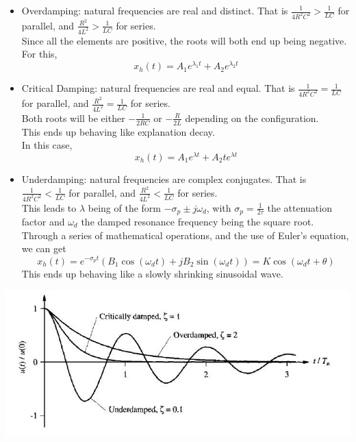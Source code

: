 \documentclass[nobib]{tufte-handout}
\begin{document}
\begin{itemize}
    \item Overdamping: natural frequencies are real and distinct. That is
          $\frac{1}{4R^2C^2} > \frac{1}{LC}$ for parallel, and $\frac{R^2}{4L^2} >
              \frac{1}{LC}$ for series.\\Since all the elements are positive, the roots will
          both end up being negative. \\ For this,
          \begin{equation*}
              x_h(t)=A_1e^{\lambda_1t}+A_2e^{\lambda_2t}
          \end{equation*}
    \item Critical Damping: natural frequencies are real and equal. That is
          $\frac{1}{4R^2C^2} = \frac{1}{LC}$ for parallel, and $\frac{R^2}{4L^2} =
              \frac{1}{LC}$ for series.\\ Both roots will be either $-\frac{1}{2RC}$ or
          $-\frac{R}{2L}$ depending on the configuration.\\This ends up behaving like
          explanation decay.\\ In this case,
          \begin{equation*}
              x_h(t) = A_1e^{\lambda t}+A_2te^{\lambda t}
          \end{equation*}
    \item Underdamping: natural frequencies are complex conjugates. That is
          $\frac{1}{4R^2C^2} < \frac{1}{LC}$ for parallel, and $\frac{R^2}{4L^2} <
              \frac{1}{LC}$ for series.\\This leads to $\lambda$ being of the form $-\sigma_p
              \pm j\omega_d$, with $\sigma_p = \frac{1}{2\tau}$ the attenuation factor and
          $\omega_d$ the damped resonance frequency being the square root.\\ Through a
          series of mathematical operations, and the use of Euler's equation, we can get
          \begin{equation*}
              x_h(t) = e^{-\sigma_p t}(B_1\cos(\omega_d t)+jB_2\sin(\omega_d t)) = K\cos(\omega_d t+\theta)
          \end{equation*}
          This ends up behaving like a slowly shrinking sinusoidal wave.
\end{itemize}
\begin{center}
    \includegraphics[width=\textwidth]{images/dampings.png}
\end{center}
\end{document}
